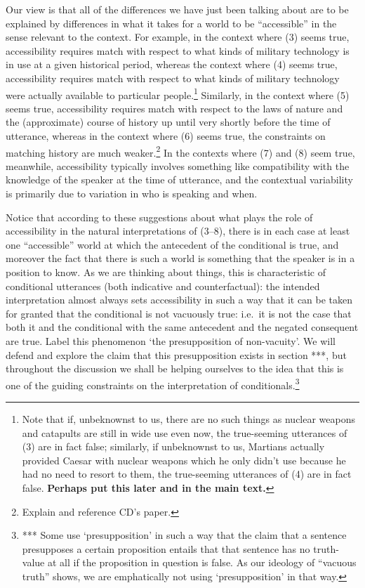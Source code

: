 Our view is that all of the differences we have just been talking about
are to be explained by differences in what it takes for a world to be
``accessible'' in the sense relevant to the context. For example, in the
context where (3) seems true, accessibility requires match with respect
to what kinds of military technology is in use at a given historical
period, whereas the context where (4) seems true, accessibility requires
match with respect to what kinds of military technology were actually
available to particular people.\footnote{Note that if, unbeknownst to
  us, there are no such things as nuclear weapons and catapults are
  still in wide use even now, the true-seeming utterances of (3) are in
  fact false; similarly, if unbeknownst to us, Martians actually
  provided Caesar with nuclear weapons which he only didn't use because
  he had no need to resort to them, the true-seeming utterances of (4)
  are in fact false. \textbf{Perhaps put this later and in the main
  text. }} Similarly, in the context where (5) seems true, accessibility
requires match with respect to the laws of nature and the (approximate)
course of history up until very shortly before the time of utterance,
whereas in the context where (6) seems true, the constraints on matching
history are much weaker.\footnote{Explain and reference CD's paper.} In
the contexts where (7) and (8) seem true, meanwhile, accessibility
typically involves something like compatibility with the knowledge of
the speaker at the time of utterance, and the contextual variability is
primarily due to variation in who is speaking and when.

Notice that according to these suggestions about what plays the role of
accessibility in the natural interpretations of (3--8), there is in each
case at least one ``accessible'' world at which the antecedent of the
conditional is true, and moreover the fact that there is such a world is
something that the speaker is in a position to know. As we are thinking
about things, this is characteristic of conditional utterances (both
indicative and counterfactual): the intended interpretation almost
always sets accessibility in such a way that it can be taken for granted
that the conditional is not vacuously true: i.e.~it is not the case that
both it and the conditional with the same antecedent and the negated
consequent are true. Label this phenomenon `the presupposition of
non-vacuity'. We will defend and explore the claim that this
presupposition exists in section ***, but throughout the discussion we
shall be helping ourselves to the idea that this is one of the guiding
constraints on the interpretation of conditionals.\footnote{*** Some use
  `presupposition' in such a way that the claim that a sentence
  presupposes a certain proposition entails that that sentence has no
  truth-value at all if the proposition in question is false. As our
  ideology of ``vacuous truth'' shows, we are emphatically not using
  `presupposition' in that way.}

